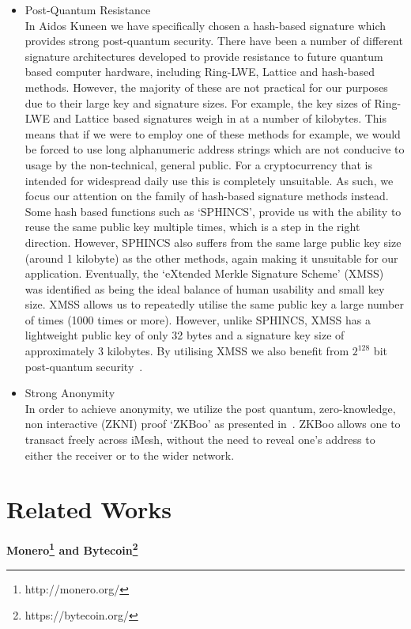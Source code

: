 \documentclass[a4paper,10pt,twocolumn]{article}
\begin{document}
\begin{itemize}
\item{Post-Quantum Resistance}\mbox{}\\ 
In Aidos Kuneen we have specifically chosen a hash-based signature which provides strong post-quantum security. There have been a 
number of different signature architectures developed to provide resistance to future quantum based computer hardware, including 
Ring-LWE, Lattice and hash-based methods. However, the majority of these are not practical for our purposes due to their large key and 
signature sizes. For example, the key sizes of Ring-LWE and Lattice based signatures weigh in at a number of kilobytes. This means that 
if we were to employ one of these methods for example, we would be forced to use long alphanumeric address strings which are not 
conducive to usage by the non-technical, general public. For a cryptocurrency that is intended for widespread daily use this is 
completely unsuitable. As such, we focus our attention on the family of hash-based signature methods instead. Some hash based functions 
such as `SPHINCS', provide us with the ability to reuse the same public key multiple times, which is a step in the right direction. 
However, SPHINCS also suffers from the same large public key size (around 1 kilobyte) as the other methods, again making it unsuitable 
for our application. Eventually, the `eXtended Merkle Signature Scheme' (XMSS) was identified as being the ideal balance of human 
usability and small key size. XMSS allows us to repeatedly utilise the same public key a large number of times (1000 times or more). 
However, unlike SPHINCS, XMSS has a lightweight public key of only 32 bytes and a signature key size of approximately 3 kilobytes. By utilising XMSS we also benefit from \( 2^{128} \) bit post-quantum security~\cite{recom}.

\item{Strong Anonymity}\\ 
In order to achieve anonymity, we utilize the post quantum, zero-knowledge, non interactive (ZKNI) proof `ZKBoo' as presented 
in~\cite{zkboo}. ZKBoo allows one to transact freely across iMesh, without the need to reveal one's address to either the receiver or to the wider network.
\end{itemize}

\section{Related Works}

{\bf Monero\footnote{http://monero.org/} and Bytecoin\footnote{https://bytecoin.org/}}
\end{document}
